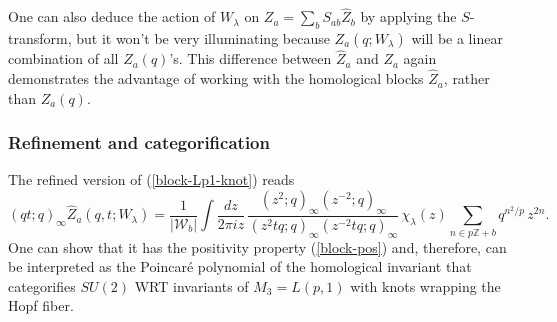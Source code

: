 \documentclass[hyper,letterpaper]{JHEP3}
\newcommand{\Z}{{\mathbb Z}}
\renewcommand{\hat}{\widehat}
\def\CW{{\mathcal W}}
\begin{document}
One can also deduce the action of $W_\lambda$ on $Z_a=\sum_{b}S_{ab}\hat{Z}_b$ by applying the $S$-transform,
but it won't be very illuminating because $Z_a(q;W_\lambda)$ will be a linear combination of all $Z_a(q)$'s. This difference between $\hat{Z}_a$ and $Z_a$ again demonstrates the advantage of working with the homological blocks $\hat{Z}_a$, rather than $Z_a(q)$.

\subsubsection{Refinement and categorification}

The refined version of (\ref{block-Lp1-knot}) reads
\begin{equation}
	(qt;q)_\infty\hat{Z}_a(q,t;W_\lambda)=
	\frac{1}{|\CW_b|}\left.\int\frac{dz}{2\pi i z}\,
	\frac{(z^2;q)_\infty(z^{-2};q)_\infty}{(z^2tq;q)_\infty(z^{-2}tq;q)_\infty}\,\chi_{\lambda}(z)\sum_{n\in p\Z+b}q^{n^2/p}\,z^{2n}\right. .
	\label{Z-hat-ref-knot}
\end{equation}
One can show that it has the positivity property (\ref{block-pos}) and, therefore, can be interpreted
as the Poincar\'e polynomial of the homological invariant that categorifies $SU(2)$ WRT invariants of
$M_3 = L(p,1)$ with knots wrapping the Hopf fiber.
\end{document}
